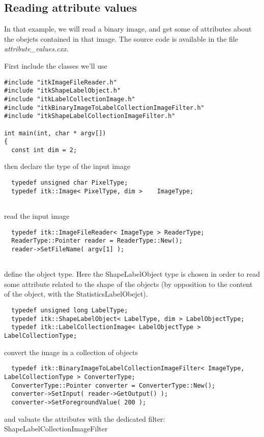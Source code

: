 \documentclass{InsightArticle}
\begin{document}
\subsection{Reading attribute values}

In that example, we will read a binary image, and get some of attributes
about the obejcts contained in that image.
The source code is available in the file {\em attribute\_values.cxx}.

First include the classes we'll use
\small \begin{verbatim}
#include "itkImageFileReader.h"
#include "itkShapeLabelObject.h"
#include "itkLabelCollectionImage.h"
#include "itkBinaryImageToLabelCollectionImageFilter.h"
#include "itkShapeLabelCollectionImageFilter.h"

int main(int, char * argv[])
{
  const int dim = 2;
\end{verbatim} \normalsize
then declare the type of the input image
\small \begin{verbatim}
  typedef unsigned char PixelType;
  typedef itk::Image< PixelType, dim >    ImageType;
  
\end{verbatim} \normalsize
read the input image
\small \begin{verbatim}
  typedef itk::ImageFileReader< ImageType > ReaderType;
  ReaderType::Pointer reader = ReaderType::New();
  reader->SetFileName( argv[1] );
  
\end{verbatim} \normalsize
define the object type. Here the ShapeLabelObject type
is chosen in order to read some attribute related to the shape
of the objects (by opposition to the content of the object, with
the StatisticsLabelObejct).
\small \begin{verbatim}
  typedef unsigned long LabelType;
  typedef itk::ShapeLabelObject< LabelType, dim > LabelObjectType;
  typedef itk::LabelCollectionImage< LabelObjectType > LabelCollectionType;

\end{verbatim} \normalsize
convert the image in a collection of objects
\small \begin{verbatim}
  typedef itk::BinaryImageToLabelCollectionImageFilter< ImageType, LabelCollectionType > ConverterType;
  ConverterType::Pointer converter = ConverterType::New();
  converter->SetInput( reader->GetOutput() );
  converter->SetForegroundValue( 200 );

\end{verbatim} \normalsize
and valuate the attributes with the dedicated filter: ShapeLabelCollectionImageFilter
\end{document}

